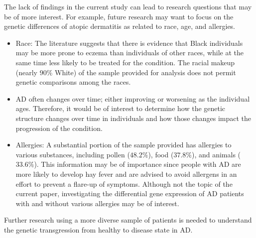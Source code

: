 \documentclass[journal, a4paper]{IEEEtran}
\begin{document}
The lack of findings in the current study can lead to research questions that may be of more interest. For example, future research may want to focus on the genetic differences of atopic dermatitis as related to race, age, and allergies.
\begin{itemize}
  \item Race: The literature suggests that there is evidence that Black individuals may be more prone to eczema than individuals of other races, while at the same time less likely to be treated for the condition. The racial makeup (nearly $90\%$ White) of the sample provided for analysis does not permit genetic comparisons among the races\cite{Eczema, fischer2017racial}.
  \item AD often changes over time; either improving or worsening as the individual ages. Therefore, it would be of interest to determine how the genetic structure changes over time in individuals and how those changes impact the progression of the condition.
  \item Allergies:  A substantial portion of the sample provided has allergies to various substances, including pollen ($48.2\%$), food ($37.8\%$), and animals ($33.6\%$). This information may be of importance since people with AD are more likely to develop hay fever and are advised to avoid allergens in an effort to prevent a flare-up of symptoms. Although not the topic of the current paper, investigating the differential gene expression of AD patients with and without various allergies may be of interest\cite{whatstoknow}.
\end{itemize}

Further research using a more diverse sample of patients is needed to understand the genetic transgression from healthy to disease state in AD. 



\end{document}
